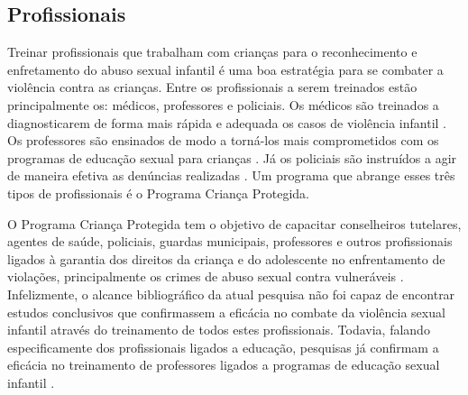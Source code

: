 


\subsection{Profissionais}\label{ssec:professores}\vspace{-0.15cm}

Treinar profissionais que trabalham com crianças para o reconhecimento e enfretamento do abuso sexual infantil é uma boa estratégia para se combater a violência contra as crianças. Entre os profissionais a serem treinados estão principalmente os: médicos, professores e policiais. Os médicos são treinados a diagnosticarem de forma mais rápida e adequada os casos de violência infantil \cite{de2012violencia}. Os professores são ensinados de modo a torná-los mais comprometidos com os programas de educação sexual para crianças \cite{dip2016advancing}. Já os policiais são instruídos a agir de maneira efetiva as denúncias realizadas \cite{pelisoli2010prevenccao}. 
Um programa que abrange esses três tipos de profissionais é o Programa Criança Protegida. 

\vspace{-0.1cm}


O Programa Criança Protegida tem o objetivo de capacitar conselheiros tutelares, agentes de saúde, policiais, guardas municipais, professores e outros profissionais ligados à garantia dos direitos da criança e do adolescente no enfrentamento de violações, principalmente os crimes de abuso sexual contra vulneráveis \cite{humanos2019ibero}. Infelizmente, o alcance bibliográfico da atual pesquisa não foi capaz de encontrar estudos conclusivos que confirmassem a eficácia no combate da violência sexual infantil através do treinamento de todos estes profissionais. Todavia, falando especificamente dos profissionais ligados a educação, pesquisas já confirmam a eficácia no treinamento de professores ligados a programas de educação sexual infantil \cite{dip2016advancing}. 


